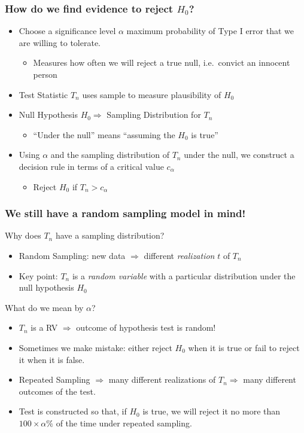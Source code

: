 \documentclass{beamer}
\begin{document}
\begin{frame}
\frametitle{How do we find evidence to reject $H_0$?}
	\begin{itemize}
		\item Choose a \alert{significance level $\alpha$} maximum probability of Type I error that we are willing to tolerate. 
			\begin{itemize}
				\item Measures how often we will reject a true null, i.e.\ convict an innocent person \pause
			\end{itemize}
		\item Test Statistic $T_n$ uses sample to measure plausibility of $H_0$ \pause
		\item Null Hypothesis $H_0 \Rightarrow$ Sampling Distribution for $T_n$  
			\begin{itemize}
				\item ``Under the null'' means ``assuming the $H_0$ is true'' \pause
			\end{itemize}
		\item Using $\alpha$ and the sampling distribution of $T_n$ under the null, we construct a \alert{decision rule} in terms of a critical value $c_\alpha$ \pause
			\begin{itemize}
				\item Reject $H_0$ if $T_n > c_\alpha$
			\end{itemize}
	\end{itemize}
	
\end{frame}
 \begin{frame}
 \frametitle{We still have a random sampling model in mind!}
 \footnotesize
 \begin{block}{Why does $T_n$ have a sampling distribution?}
 	\begin{itemize}
 		\item Random Sampling: new data $\Rightarrow$ different \emph{realization} $t$ of $T_n$ 
 		\item Key point: $T_n$ is a \emph{random variable} with a particular distribution under the null hypothesis $H_0$ \pause
 	\end{itemize}
 \end{block}

\begin{block}{What do we mean by $\alpha$?} 
 	\begin{itemize}
 		\item $T_n$ is a RV $\Rightarrow$ outcome of hypothesis test is random! 
 		\item Sometimes we make mistake: either reject $H_0$ when it is true or fail to reject it when it is false. 
 		\item Repeated Sampling $\Rightarrow$ many different realizations of $T_n\Rightarrow$ many different outcomes of the test. 
 		\item Test is constructed so that, if $H_0$ is true, we will reject it no more than $100\times \alpha \%$ of the time under repeated sampling.
 	\end{itemize}
 \end{block}
 \end{frame}
\end{document}
